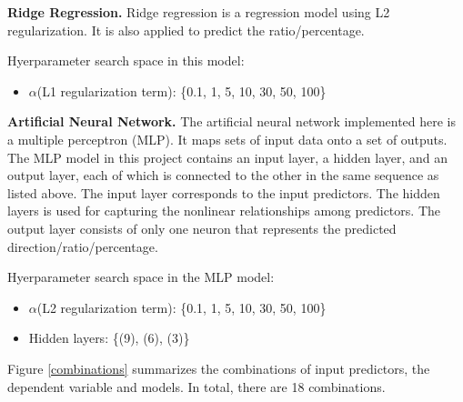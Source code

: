 \documentclass[letterpaper]{article}
\begin{document}
\textbf{Ridge Regression.} Ridge regression is a regression model using L2
regularization. It is also applied to predict the ratio/percentage.

Hyerparameter search space in this model:
\begin{itemize}
  \item $\alpha$(L1 regularization term): \{0.1, 1, 5, 10, 30, 50, 100\}
\end{itemize}

\textbf{Artificial Neural Network.} The artificial neural network implemented
here is a multiple perceptron (MLP). It maps sets of input data onto a set of
outputs. The MLP model in this project contains an input layer, a hidden layer,
and an output layer, each of which is connected to the other in the same
sequence as listed above. The input layer corresponds to the input predictors.
The hidden layers is used for capturing the nonlinear relationships among
predictors. The output layer consists of only one neuron that represents the
predicted direction/ratio/percentage.

Hyerparameter search space in the MLP model:
\begin{itemize}
  \item $\alpha$(L2 regularization term): \{0.1, 1, 5, 10, 30, 50, 100\}
  \item Hidden layers: \{(9), (6), (3)\}
\end{itemize}

Figure \ref{combinations} summarizes the combinations of input predictors, the dependent
variable and models. In total, there are 18 combinations.
\end{document}
